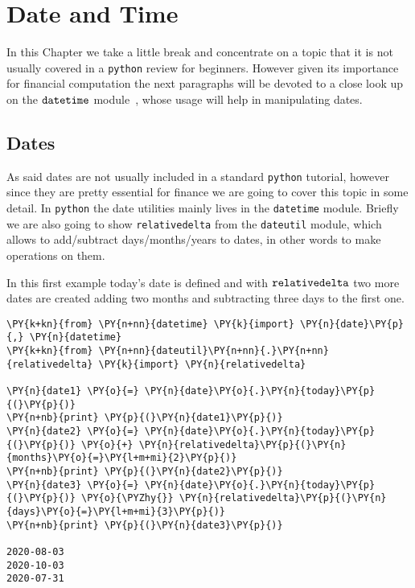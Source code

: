 \chapter{Date and Time}
\label{sec:datetime}

In this Chapter we take a little break and concentrate on a topic that it is not usually covered 
in a \texttt{python} review for beginners. However given its importance for financial computation 
the next paragraphs will be devoted to a close look up on the $\tt{datetime}$ module~\cite{bib:datetime}, whose usage 
will help in manipulating dates.

\section{Dates}\label{dates}

As said dates are not usually included in a standard \texttt{python} tutorial, however since they 
are pretty essential for finance we are going to cover this topic in some detail. 
In \texttt{python} the date utilities mainly lives in the \texttt{datetime} module. Briefly we are 
also going to show \texttt{relativedelta} from the \texttt{dateutil} module, which allows to 
add/subtract days/months/years to dates, in other words to make operations on them.

In this first example today's date is defined and with $\tt{relativedelta}$ two more dates are created 
adding two months and subtracting three days to the first one.

\begin{codebox}
\begin{Verbatim}[commandchars=\\\{\}]
\PY{k+kn}{from} \PY{n+nn}{datetime} \PY{k}{import} \PY{n}{date}\PY{p}{,} \PY{n}{datetime}
\PY{k+kn}{from} \PY{n+nn}{dateutil}\PY{n+nn}{.}\PY{n+nn}{relativedelta} \PY{k}{import} \PY{n}{relativedelta}

\PY{n}{date1} \PY{o}{=} \PY{n}{date}\PY{o}{.}\PY{n}{today}\PY{p}{(}\PY{p}{)}
\PY{n+nb}{print} \PY{p}{(}\PY{n}{date1}\PY{p}{)}
\PY{n}{date2} \PY{o}{=} \PY{n}{date}\PY{o}{.}\PY{n}{today}\PY{p}{(}\PY{p}{)} \PY{o}{+} \PY{n}{relativedelta}\PY{p}{(}\PY{n}{months}\PY{o}{=}\PY{l+m+mi}{2}\PY{p}{)}
\PY{n+nb}{print} \PY{p}{(}\PY{n}{date2}\PY{p}{)}
\PY{n}{date3} \PY{o}{=} \PY{n}{date}\PY{o}{.}\PY{n}{today}\PY{p}{(}\PY{p}{)} \PY{o}{\PYZhy{}} \PY{n}{relativedelta}\PY{p}{(}\PY{n}{days}\PY{o}{=}\PY{l+m+mi}{3}\PY{p}{)}
\PY{n+nb}{print} \PY{p}{(}\PY{n}{date3}\PY{p}{)}

2020-08-03
2020-10-03
2020-07-31
\end{Verbatim}
\end{codebox}

